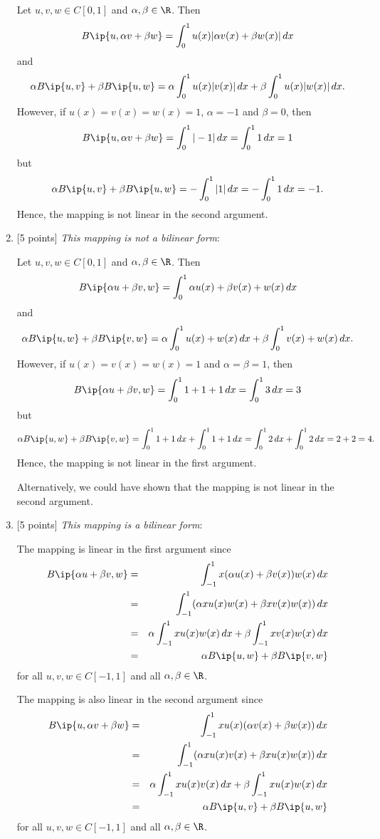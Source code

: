 \begin{solution}
\begin{enumerate}
Let $u,v,w\in C[0,1]$ and $\alpha,\beta\in\R$. Then
\[ B\ip{u,\alpha v + \beta w} = \int_0^1 u(x)|\alpha v(x)+\beta w(x)| \, d x\]
and
\[ \alpha B\ip{u,v} + \beta B\ip{u,w} = \alpha\int_0^1 u(x) |v(x)|\, d x+\beta\int_0^1 u(x) |w(x)|\, d x.\]
However, if $u(x)=v(x)=w(x)=1$, $\alpha=-1$ and $\beta=0$, then
\[ B\ip{u,\alpha v + \beta w} = \int_0^1 |-1| \, d x = \int_0^1 1 \, d x=1\]
but
\[ \alpha B\ip{u,v} + \beta B\ip{u,w} = -\int_0^1 |1|\, d x=-\int_0^1 1\, d x=-1.\]
Hence, the mapping is not linear in the second argument.

\item {[5 points]} \emph{This mapping is not a bilinear form}: 

Let $u,v,w\in C[0,1]$ and $\alpha,\beta\in\R$. Then
\[ B\ip{\alpha u + \beta v, w} = \int_0^1\alpha u(x)+\beta v(x) + w(x) \,dx\]
and
\[ \alpha B\ip{u,w} + \beta B\ip{v,w} = \alpha\int_0^1 u(x)+ w(x) \,dx+\beta\int_0^1 v(x) + w(x) \,dx.\]
However, if $u(x)=v(x)=w(x)=1$ and $\alpha=\beta=1$, then
\[ B\ip{\alpha u+\beta v,w} = \int_0^1 1+1+1 \, d x = \int_0^1 3 \, d x=3\]
but
\[ \alpha B\ip{u,w} + \beta B\ip{v,w} = \int_0^1 1+1\, d x + \int_0^1 1+1\, d x=\int_0^1 2\, d x + \int_0^1 2\, d x=2+2=4.\]
Hence, the mapping is not linear in the first argument.

Alternatively, we could have shown that the mapping is not linear in the second argument.
\\
\item {[5 points]} \emph{This mapping is a bilinear form}:

The mapping is linear in the first argument since
\begin{eqnarray*}
B\ip{\alpha u + \beta v, w} &=& \int_{-1}^1 x(\alpha u(x) + \beta v(x)) w(x) \, d x
\\
&=&  \int_{-1}^1 (\alpha xu(x)w(x) + \beta xv(x)w(x))  \, d x
\\
&=&  \alpha \int_{-1}^1 xu(x)w(x) \, dx +  \beta \int_{-1}^1 xv(x)w(x) \, dx
\\
&=& \alpha B\ip{u,w} + \beta B\ip{v,w}
\end{eqnarray*}
for all $u,v,w\in C[-1,1]$ and all $\alpha,\beta\in\R$.

The mapping is also linear in the second argument since
\begin{eqnarray*}
B\ip{u, \alpha v+\beta w} &=& \int_{-1}^1 xu(x)(\alpha v(x) + \beta w(x)) \, d x
\\
&=&  \int_{-1}^1 (\alpha xu(x)v(x) + \beta xu(x)w(x))  \, d x
\\
&=&  \alpha \int_{-1}^1 xu(x)v(x) \, dx +  \beta \int_{-1}^1 xu(x)w(x) \, dx
\\
&=& \alpha B\ip{u,v} + \beta B\ip{u,w}
\end{eqnarray*}
for all $u,v,w\in C[-1,1]$ and all $\alpha,\beta\in\R$.
\end{enumerate}
\end{solution}